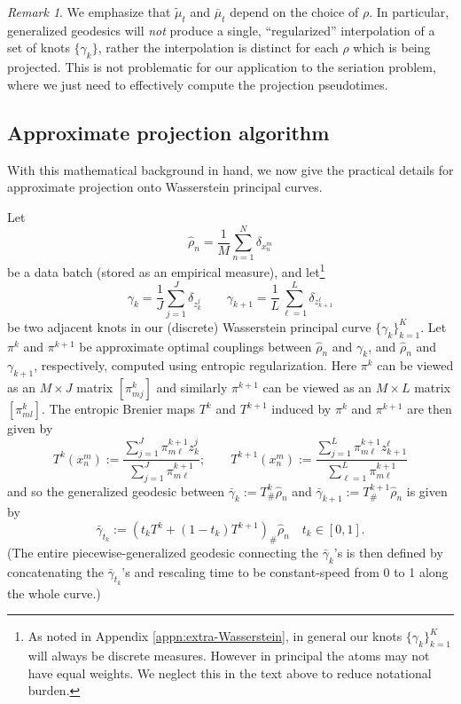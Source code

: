 \documentclass[aos, preprint]{imsart}
\theoremstyle{plain}
\theoremstyle{remark}
\newtheorem{rem}[example]{Remark}
\begin{document}
\begin{appendix}
\begin{rem}
    We emphasize that $\tilde{\mu}_t$ and $\bar{\mu}_t$ depend on the choice of $\rho$. In particular, generalized geodesics will \emph{not} produce a single, ``regularized'' interpolation of a set of knots $\{\gamma_k\}$, rather the interpolation is distinct for each $\rho$ which is being projected. This is not problematic for our application to the seriation problem, where we just need to effectively compute the projection pseudotimes.
\end{rem}


\subsection*{Approximate projection algorithm}
With this mathematical background in hand, we now give the practical
details for approximate projection onto Wasserstein principal curves.

Let
\begin{equation*}
    \hat{\rho}_{n}=\frac{1}{M}\sum_{n=1}^{N}\delta_{x_{n}^{m}}
\end{equation*}
be a data batch (stored as an empirical measure), and let\footnote{As noted in Appendix \ref{appn:extra-Wasserstein}, in general our knots $\{\gamma_{k}\}_{k=1}^{K}$
will always be discrete measures. However in principal the atoms may
not have equal weights. We neglect this in the  text above to
reduce notational burden.}
\begin{equation*}
    \gamma_{k}=\frac{1}{J}\sum_{j=1}^{J}\delta_{z_{k}^{j}} \qquad \gamma_{k+1}=\frac{1}{L}\sum_{\ell=1}^{L}\delta_{z_{k+1}^{\ell}}
\end{equation*}
be two adjacent knots in our (discrete) Wasserstein principal curve $\{\gamma_{k}\}_{k=1}^{K}$.
Let $\pi^{k}$ and $\pi^{k+1}$ be approximate optimal couplings between
$\hat{\rho}_{n}$ and $\gamma_{k}$, and $\hat{\rho}_{n}$ and $\gamma_{k+1}$,
respectively, computed using entropic regularization. Here $\pi^{k}$
can be viewed as an $M\times J$ matrix $[\pi_{mj}^{k}]$ and similarly
$\pi^{k+1}$ can be viewed as an $M\times L$ matrix $[\pi_{ml}^{k}]$.
The entropic Brenier maps $T^{k}$ and $T^{k+1}$ induced by $\pi^{k}$
and $\pi^{k+1}$ are then given by
\[
T^{k}(x_{n}^{m}):=\frac{\sum_{j=1}^{J}\pi_{m\ell}^{k+1}z_{k}^{j}}{\sum_{j=1}^{J}\pi_{m\ell}^{k+1}};\qquad T^{k+1}(x_{n}^{m}):=\frac{\sum_{j=1}^{L}\pi_{m\ell}^{k+1}z_{k+1}^{\ell}}{\sum_{\ell=1}^{L}\pi_{m\ell}^{k+1}}
\]
and so the generalized geodesic between $\bar{\gamma}_{k}:=T_{\#}^{k}\hat{\rho}_{n}$
and $\bar{\gamma}_{k+1}:=T_{\#}^{k+1}\hat{\rho}_{n}$ is given by
\[
\bar{\gamma}_{t_{k}}:=\left(t_{k}T^{k}+(1-t_{k})T^{k+1}\right)_{\#}\hat{\rho}_{n}\quad t_{k}\in[0,1].
\]
(The entire piecewise-generalized geodesic connecting the $\bar{\gamma}_{k}$'s
is then defined by concatenating the $\bar{\gamma}_{t_{k}}$'s and
rescaling time to be constant-speed from 0 to 1 along the whole curve.)


\end{appendix}
\end{document}
